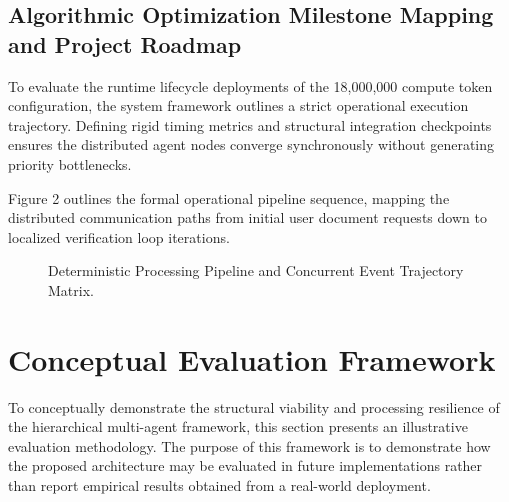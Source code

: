 \subsection{Algorithmic Optimization Milestone Mapping and Project Roadmap}
To evaluate the runtime lifecycle deployments of the 18,000,000 compute token configuration, the system framework outlines a strict operational execution trajectory. Defining rigid timing metrics and structural integration checkpoints ensures the distributed agent nodes converge synchronously without generating priority bottlenecks. 

Figure 2 outlines the formal operational pipeline sequence, mapping the distributed communication paths from initial user document requests down to localized verification loop iterations.

\begin{figure}[htbp]
\centering
{}
\caption{Deterministic Processing Pipeline and Concurrent Event Trajectory Matrix.}
\label{fig:pipeline_flow}
\end{figure}

\section{Conceptual Evaluation Framework}
To conceptually demonstrate the structural viability and processing resilience of the hierarchical multi-agent framework, this section presents an illustrative evaluation methodology. The purpose of this framework is to demonstrate how the proposed architecture may be evaluated in future implementations rather than report empirical results obtained from a real-world deployment.

